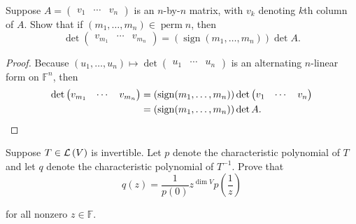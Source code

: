 \begin{exercise}\label{chapter9:sectionC:exercise6}
    Suppose $A = \begin{pmatrix}v_{1} & \cdots & v_{n}\end{pmatrix}$ is an $n$-by-$n$ matrix, with $v_{k}$ denoting $k$th column of $A$. Show that if $(m_{1}, \ldots, m_{n})\in \operatorname{perm}n$, then
    \[
        \det\begin{pmatrix}v_{m_{1}} & \cdots & v_{m_{n}}\end{pmatrix} = (\operatorname{sign}(m_{1}, \ldots, m_{n}))\det A.
    \]
\end{exercise}

\begin{proof}
    Because $(u_{1}, \ldots, u_{n})\mapsto \det\begin{pmatrix}u_{1} & \cdots & u_{n}\end{pmatrix}$ is an alternating $n$-linear form on $\mathbb{F}^{n}$, then
    \begin{align*}
        \det\begin{pmatrix}v_{m_{1}} & \cdots & v_{m_{n}}\end{pmatrix} & = (\operatorname{sign}(m_{1}, \ldots, m_{n}))\det\begin{pmatrix}v_{1} & \cdots & v_{n}\end{pmatrix} \\
                                                                                                 & = (\operatorname{sign}(m_{1}, \ldots, m_{n}))\det A.\qedhere
    \end{align*}
\end{proof}
\newpage

\begin{exercise}\label{chapter9:sectionC:exercise7}
    Suppose $T\in\mathcal{L}\left({V}\right)$ is invertible. Let $p$ denote the characteristic polynomial of $T$ and let $q$ denote the characteristic polynomial of $T^{-1}$. Prove that
    \[
        q(z) = \frac{1}{p(0)}z^{\dim V}p\left(\frac{1}{z}\right)
    \]

    for all nonzero $z\in\mathbb{F}$.
\end{exercise}

